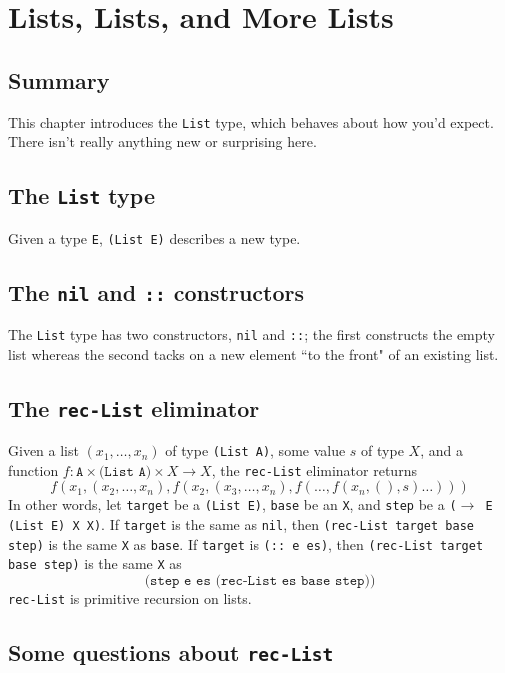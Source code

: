 \documentclass{article}
\newcommand{\ttt}[1]{\texttt{#1}}
\begin{document}
\section{Lists, Lists, and More Lists}
\subsection{Summary}
This chapter introduces the \ttt{List} type, which behaves about how you'd expect. There isn't really anything new or surprising here.
\subsection{The \ttt{List} type}
Given a type \ttt{E}, \ttt{(List E)} describes a new type.
\subsection{The \ttt{nil} and \ttt{::} constructors}
The \ttt{List} type has two constructors, \ttt{nil} and \ttt{::}; the first constructs the empty list whereas the second tacks on a new element ``to the front" of an existing list.
\subsection{The \ttt{rec-List} eliminator}
Given a list \((x_1, \dots, x_n)\) of type \ttt{(List A)}, some value \(s\) of type \(X\), and a function \(f : \ttt{A} \times \ttt{(List A)} \times X \to X\), the \ttt{rec-List} eliminator returns \[
    f(x_1, (x_2, \dots, x_n), f(x_2, (x_3, \dots, x_n), f(\dots, f(x_n, (), s) \dots)))
\]
In other words, let \ttt{target} be a \ttt{(List E)}, \ttt{base} be an \ttt{X}, and \ttt{step} be a \ttt{(\(\to\) E (List E) X X)}. If \ttt{target} is the same as \ttt{nil}, then \ttt{(rec-List target base step)} is the same \ttt{X} as \ttt{base}. If \ttt{target} is \ttt{(:: e es)}, then \ttt{(rec-List target base step)} is the same \ttt{X} as \[
    \ttt{(step e es (rec-List es base step))}
\]
\ttt{rec-List} is primitive recursion on lists.
\subsection{Some questions about \ttt{rec-List}}
\end{document}
